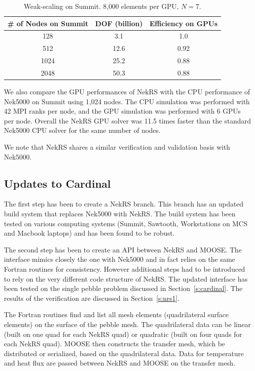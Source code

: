 \begin{table} [!b]
\begin{center} \begin{tabular}{ccc}
\toprule
\# of Nodes on Summit & DOF (billion) &  Efficiency on GPUs \\
\midrule
 128  & 3.1  & 1.0   \\
 512  & 12.6 & 0.92  \\
 1024 & 25.2 & 0.88  \\
 2048 & 50.3 & 0.88 \\
\bottomrule \end{tabular} \end{center}
\caption{\label{wscaling} Weak-scaling on Summit. 8,000 elements per GPU, $N=7$.}
\end{table}

We also compare the GPU performances of NekRS with the CPU performance of Nek5000 on Summit using 1,024 nodes. The CPU simulation was performed with 42 MPI ranks per node, and the GPU simulation was performed with 6 GPUs  per node. Overall the NekRS GPU solver was 11.5 times faster than the standard Nek5000 CPU solver for the same number of nodes.

We note that NekRS shares a similar verification and validation basis with Nek5000.

\subsection{Updates to Cardinal}

The first step has been to create a NekRS branch. This branch has an updated build system that replaces Nek5000 with NekRS. The build system has been tested on various computing systems (Summit, Sawtooth, Workstations on MCS and Macbook laptops) and has been found to be robust.

The second step has been to create an API between NekRS and MOOSE. The interface mimics closely the one with Nek5000 and in fact relies on the same Fortran routines for consistency. However additional steps had to be introduced to rely on the very different code structure of NekRS. The updated interface has been tested on the single pebble problem discussed in Section~\ref{s:cardinal}. The results of the verification are discussed in Section~\ref{s:nrs1}.

The Fortran routines find and list all mesh elements (quadrilateral surface elements) on the surface of the pebble mesh. The quadrilateral data can be linear (built on one quad for each NekRS quad) or quadratic (built on four quads for each NekRS quad). MOOSE then constructs the transfer mesh, which be distributed or serialized, based on the quadrilateral data. Data for temperature and heat flux are passed between NekRS and MOOSE on the transfer mesh.

